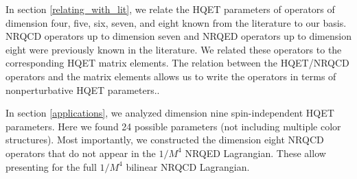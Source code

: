 In section \ref{relating_with_lit}, we relate the HQET parameters of operators of dimension four, five, six, seven, and eight known from the literature to our basis. NRQCD operators up to dimension seven and NRQED operators up to dimension eight were previously known in the literature. We related these operators to the corresponding HQET matrix elements. The relation between the HQET/NRQCD operators and the matrix elements allows us to write the operators in terms of nonperturbative HQET parameters.\cite{Gunawardana:2017zix}.\par
In section \ref{applications}, we analyzed dimension nine spin-independent HQET parameters. Here we found 24 possible parameters (not including multiple color structures). Most importantly, we constructed the dimension eight NRQCD operators that do not appear in the $1/M^4$ NRQED Lagrangian. These allow presenting for the full $1/M^4$ bilinear NRQCD Lagrangian.\par
